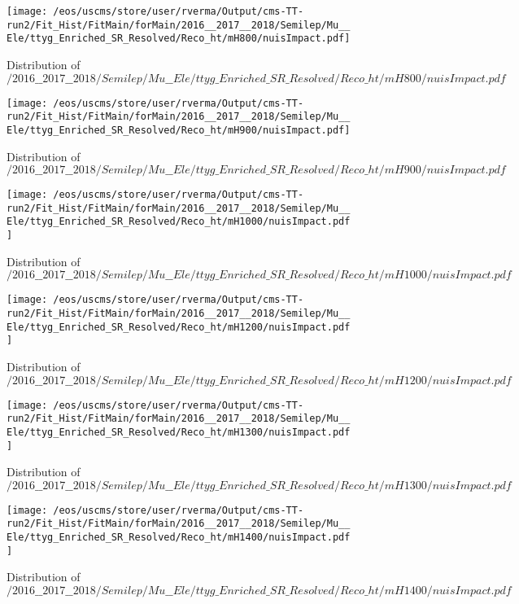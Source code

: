 \begin{figure}
\centering
\texttt{[image: /eos/uscms/store/user/rverma/Output/cms-TT-run2/Fit\_Hist/FitMain/forMain/2016\_\_2017\_\_2018/Semilep/Mu\_\_Ele/ttyg\_Enriched\_SR\_Resolved/Reco\_ht/mH800/nuisImpact.pdf]}
\caption{Distribution of $/2016\_\_2017\_\_2018/Semilep/Mu\_\_Ele/ttyg\_Enriched\_SR\_Resolved/Reco\_ht/mH800/nuisImpact.pdf$}
\end{figure}

\begin{figure}
\centering
\texttt{[image: /eos/uscms/store/user/rverma/Output/cms-TT-run2/Fit\_Hist/FitMain/forMain/2016\_\_2017\_\_2018/Semilep/Mu\_\_Ele/ttyg\_Enriched\_SR\_Resolved/Reco\_ht/mH900/nuisImpact.pdf]}
\caption{Distribution of $/2016\_\_2017\_\_2018/Semilep/Mu\_\_Ele/ttyg\_Enriched\_SR\_Resolved/Reco\_ht/mH900/nuisImpact.pdf$}
\end{figure}

\begin{figure}
\centering
\texttt{[image: /eos/uscms/store/user/rverma/Output/cms-TT-run2/Fit\_Hist/FitMain/forMain/2016\_\_2017\_\_2018/Semilep/Mu\_\_Ele/ttyg\_Enriched\_SR\_Resolved/Reco\_ht/mH1000/nuisImpact.pdf]}
\caption{Distribution of $/2016\_\_2017\_\_2018/Semilep/Mu\_\_Ele/ttyg\_Enriched\_SR\_Resolved/Reco\_ht/mH1000/nuisImpact.pdf$}
\end{figure}

\begin{figure}
\centering
\texttt{[image: /eos/uscms/store/user/rverma/Output/cms-TT-run2/Fit\_Hist/FitMain/forMain/2016\_\_2017\_\_2018/Semilep/Mu\_\_Ele/ttyg\_Enriched\_SR\_Resolved/Reco\_ht/mH1200/nuisImpact.pdf]}
\caption{Distribution of $/2016\_\_2017\_\_2018/Semilep/Mu\_\_Ele/ttyg\_Enriched\_SR\_Resolved/Reco\_ht/mH1200/nuisImpact.pdf$}
\end{figure}

\begin{figure}
\centering
\texttt{[image: /eos/uscms/store/user/rverma/Output/cms-TT-run2/Fit\_Hist/FitMain/forMain/2016\_\_2017\_\_2018/Semilep/Mu\_\_Ele/ttyg\_Enriched\_SR\_Resolved/Reco\_ht/mH1300/nuisImpact.pdf]}
\caption{Distribution of $/2016\_\_2017\_\_2018/Semilep/Mu\_\_Ele/ttyg\_Enriched\_SR\_Resolved/Reco\_ht/mH1300/nuisImpact.pdf$}
\end{figure}

\begin{figure}
\centering
\texttt{[image: /eos/uscms/store/user/rverma/Output/cms-TT-run2/Fit\_Hist/FitMain/forMain/2016\_\_2017\_\_2018/Semilep/Mu\_\_Ele/ttyg\_Enriched\_SR\_Resolved/Reco\_ht/mH1400/nuisImpact.pdf]}
\caption{Distribution of $/2016\_\_2017\_\_2018/Semilep/Mu\_\_Ele/ttyg\_Enriched\_SR\_Resolved/Reco\_ht/mH1400/nuisImpact.pdf$}
\end{figure}

